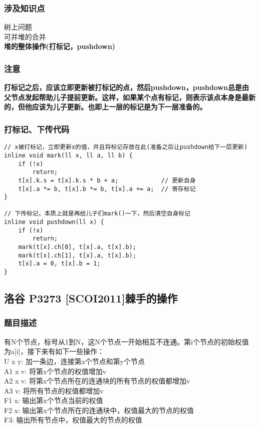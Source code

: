 		\subsubsection{涉及知识点}
			树上问题\\
			可并堆的合并\\
			\textbf{堆的整体操作(打标记，pushdown)}
		\subsubsection{注意}
			\textbf{打标记之后，应该立即更新被打标记的点，然后pushdown，pushdown总是由父节点发起帮助儿子提前更新。这样，如果某个点有标记，则表示该点本身是最新的，但他应该为儿子更新。也即上一层的标记是为下一层准备的。}
		\subsubsection{打标记、下传代码}
\begin{lstlisting}
// x被打标记，立即更新x的值，并且将标记存放在此(准备之后让pushdown给下一层更新)
inline void mark(ll x, ll a, ll b) {
    if (!x)
        return;
    t[x].k.s = t[x].k.s * b + a;            // 更新自身
    t[x].a *= b, t[x].b *= b, t[x].a += a;  // 寄存标记
}

// 下传标记，本质上就是再给儿子们mark()一下，然后清空自身标记
inline void pushdown(ll x) {
    if (!x)
        return;
    mark(t[x].ch[0], t[x].a, t[x].b);
    mark(t[x].ch[1], t[x].a, t[x].b);
    t[x].a = 0, t[x].b = 1;
}
\end{lstlisting}

	\subsection{洛谷 P3273 [SCOI2011]棘手的操作}
		\subsubsection{题目描述}
			有N个节点，标号从1到N，这N个节点一开始相互不连通。第i个节点的初始权值为a[i]，接下来有如下一些操作：\\
			U x y: 加一条边，连接第x个节点和第y个节点\\
			A1 x v: 将第x个节点的权值增加v\\
			A2 x v: 将第x个节点所在的连通块的所有节点的权值都增加v\\
			A3 v: 将所有节点的权值都增加v\\
			F1 x: 输出第x个节点当前的权值\\
			F2 x: 输出第x个节点所在的连通块中，权值最大的节点的权值\\
			F3: 输出所有节点中，权值最大的节点的权值\\
